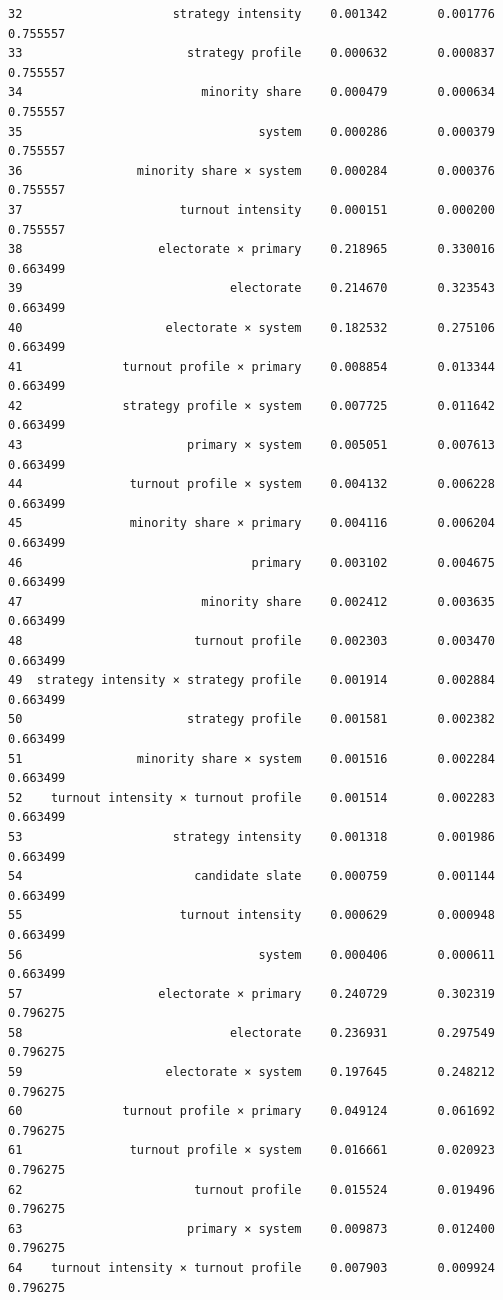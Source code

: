 \documentclass[11pt]{article}
\begin{document}
\begin{tcolorbox}[breakable, size=fbox, boxrule=.5pt, pad at break*=1mm, opacityfill=0]
\begin{Verbatim}[commandchars=\\\{\}]
32                     strategy intensity    0.001342       0.001776  0.755557
33                       strategy profile    0.000632       0.000837  0.755557
34                         minority share    0.000479       0.000634  0.755557
35                                 system    0.000286       0.000379  0.755557
36                minority share × system    0.000284       0.000376  0.755557
37                      turnout intensity    0.000151       0.000200  0.755557
38                   electorate × primary    0.218965       0.330016  0.663499
39                             electorate    0.214670       0.323543  0.663499
40                    electorate × system    0.182532       0.275106  0.663499
41              turnout profile × primary    0.008854       0.013344  0.663499
42              strategy profile × system    0.007725       0.011642  0.663499
43                       primary × system    0.005051       0.007613  0.663499
44               turnout profile × system    0.004132       0.006228  0.663499
45               minority share × primary    0.004116       0.006204  0.663499
46                                primary    0.003102       0.004675  0.663499
47                         minority share    0.002412       0.003635  0.663499
48                        turnout profile    0.002303       0.003470  0.663499
49  strategy intensity × strategy profile    0.001914       0.002884  0.663499
50                       strategy profile    0.001581       0.002382  0.663499
51                minority share × system    0.001516       0.002284  0.663499
52    turnout intensity × turnout profile    0.001514       0.002283  0.663499
53                     strategy intensity    0.001318       0.001986  0.663499
54                        candidate slate    0.000759       0.001144  0.663499
55                      turnout intensity    0.000629       0.000948  0.663499
56                                 system    0.000406       0.000611  0.663499
57                   electorate × primary    0.240729       0.302319  0.796275
58                             electorate    0.236931       0.297549  0.796275
59                    electorate × system    0.197645       0.248212  0.796275
60              turnout profile × primary    0.049124       0.061692  0.796275
61               turnout profile × system    0.016661       0.020923  0.796275
62                        turnout profile    0.015524       0.019496  0.796275
63                       primary × system    0.009873       0.012400  0.796275
64    turnout intensity × turnout profile    0.007903       0.009924  0.796275

\end{Verbatim}
\end{tcolorbox}
\end{document}
